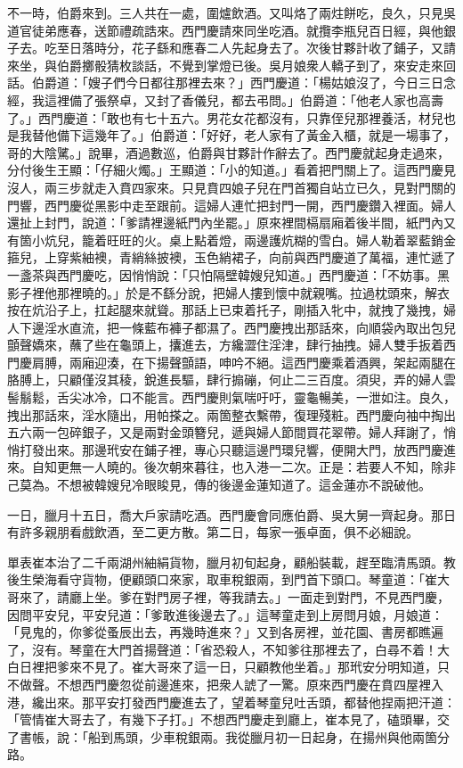 不一時，伯爵來到。三人共在一處，圍爐飲酒。又叫烙了兩炷餅吃，良久，只見吳道官徒弟應春，送節禮疏誥來。西門慶請來同坐吃酒。就攬李瓶兒百日經，與他銀子去。吃至日落時分，花子繇和應春二人先起身去了。次後甘夥計收了鋪子，又請來坐，與伯爵擲骰猜枚談話，不覺到掌燈已後。吳月娘衆人轎子到了，來安走來回話。伯爵道：「嫂子們今日都往那裡去來？」西門慶道：「楊姑娘沒了，今日三日念經，我這裡備了張祭卓，又封了香儀兒，都去弔問。」伯爵道：「他老人家也高壽了。」西門慶道：「敢也有七十五六。男花女花都沒有，只靠侄兒那裡養活，材兒也是我替他備下這幾年了。」伯爵道：「好好，老人家有了黃金入櫃，就是一場事了，哥的大陰騭。」說畢，酒過數巡，伯爵與甘夥計作辭去了。西門慶就起身走過來，分付後生王顯：「仔細火燭。」王顯道：「小的知道。」看着把門關上了。這西門慶見沒人，兩三步就走入賁四家來。只見賁四娘子兒在門首獨自站立已久，見對門關的門響，西門慶從黑影中走至跟前。這婦人連忙把封門一開，西門慶鑽入裡面。婦人還扯上封門，說道：「爹請裡邊紙門內坐罷。」原來裡間槅扇廂着後半間，紙門內又有箇小炕兒，籠着旺旺的火。桌上點着燈，兩邊護炕糊的雪白。婦人勒着翠藍銷金箍兒，上穿紫紬襖，青綃絲披襖，玉色綃裙子，向前與西門慶道了萬福，連忙遞了一盞茶與西門慶吃，因悄悄說：「只怕隔壁韓嫂兒知道。」西門慶道：「不妨事。黑影子裡他那裡曉的。」{}於是不繇分說，把婦人摟到懷中就親嘴。拉過枕頭來，解衣按在炕沿子上，扛起腿來就聳。那話上已束着托子，剛插入牝中，就拽了幾拽，婦人下邊淫水直流，把一條藍布褲子都濕了。西門慶拽出那話來，向順袋內取出包兒顫聲嬌來，蘸了些在龜頭上，攮進去，方纔澀住淫津，肆行抽拽。婦人雙手扳着西門慶肩膊，兩廂迎湊，在下揚聲顫語，呻吟不絕。這西門慶乘着酒興，架起兩腿在胳膊上，只顧僅沒其稜，銳進長驅，肆行搧磞，何止二三百度。須臾，弄的婦人雲髻鬅鬆，舌尖冰冷，口不能言。西門慶則氣喘吁吁，靈龜暢美，一泄如注。良久，拽出那話來，淫水隨出，用帕搽之。兩箇整衣繫帶，復理殘粧。西門慶向袖中掏出五六兩一包碎銀子，又是兩對金頭簪兒，遞與婦人節間買花翠帶。婦人拜謝了，悄悄打發出來。那邊玳安在鋪子裡，專心只聽這邊門環兒響，便開大門，放西門慶進來。自知更無一人曉的。後次朝來暮往，也入港一二次。正是：若要人不知，除非己莫為。不想被韓嫂兒冷眼睃見，傳的後邊金蓮知道了。這金蓮亦不說破他。

一日，臘月十五日，喬大戶家請吃酒。西門慶會同應伯爵、吳大舅一齊起身。那日有許多親朋看戲飲酒，至二更方散。第二日，每家一張卓面，俱不必細說。

單表崔本治了二千兩湖州紬絹貨物，臘月初旬起身，顧船裝載，趕至臨清馬頭。教後生榮海看守貨物，便顧頭口來家，取車稅銀兩，到門首下頭口。琴童道：「崔大哥來了，請廳上坐。爹在對門房子裡，等我請去。」一面走到對門，不見西門慶，因問平安兒，平安兒道：「爹敢進後邊去了。」這琴童走到上房問月娘，月娘道：「見鬼的，你爹從蚤辰出去，再幾時進來？」又到各房裡，並花園、書房都瞧遍了，沒有。琴童在大門首揚聲道：「省恐殺人，不知爹往那裡去了，白尋不着！大白日裡把爹來不見了。崔大哥來了這一日，只顧教他坐着。」那玳安分明知道，只不做聲。{}不想西門慶忽從前邊進來，把衆人諕了一驚。原來西門慶在賁四屋裡入港，纔出來。那平安打發西門慶進去了，望着琴童兒吐舌頭，都替他捏兩把汗道：「管情崔大哥去了，有幾下子打。」不想西門慶走到廳上，崔本見了，磕頭畢，交了書帳，說：「船到馬頭，少車稅銀兩。我從臘月初一日起身，在揚州與他兩箇分路。

